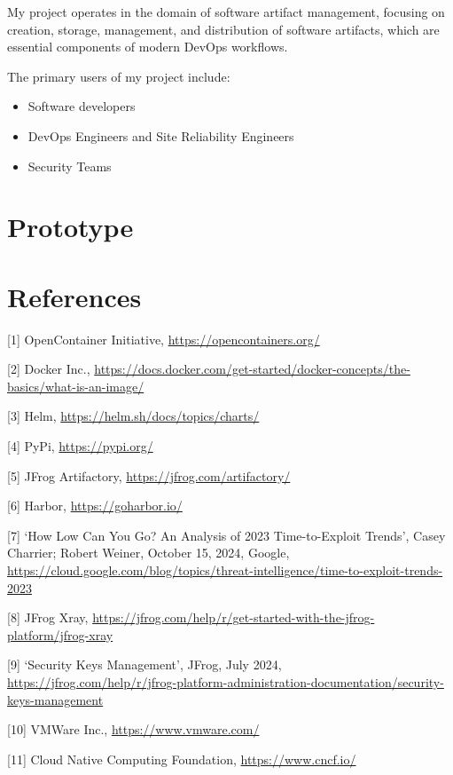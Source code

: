 \documentclass{article}
\begin{document}
  My project operates in the domain of software artifact management, focusing on creation, storage, management, and distribution of software artifacts, which are essential components of modern DevOps workflows.

  The primary users of my project include:

  \begin{itemize}
    \item Software developers
    \item DevOps Engineers and Site Reliability Engineers
    \item Security Teams
  \end{itemize}


  




  \section{Prototype}


  \section{References}

  [1] OpenContainer Initiative, \url{https://opencontainers.org/}
  
  [2] Docker Inc., \url{https://docs.docker.com/get-started/docker-concepts/the-basics/what-is-an-image/}

  [3] Helm, \url{https://helm.sh/docs/topics/charts/}

  [4] PyPi, \url{https://pypi.org/}

  [5] JFrog Artifactory, \url{https://jfrog.com/artifactory/}

  [6] Harbor, \url{https://goharbor.io/}

  [7] `How Low Can You Go? An Analysis of 2023 Time-to-Exploit Trends', Casey Charrier; Robert Weiner, October 15, 2024, Google, \url{https://cloud.google.com/blog/topics/threat-intelligence/time-to-exploit-trends-2023}

  [8] JFrog Xray, \url{https://jfrog.com/help/r/get-started-with-the-jfrog-platform/jfrog-xray}

  [9] `Security Keys Management', JFrog, July 2024, \url{https://jfrog.com/help/r/jfrog-platform-administration-documentation/security-keys-management}

  [10] VMWare Inc., \url{https://www.vmware.com/}

  [11] Cloud Native Computing Foundation, \url{https://www.cncf.io/}
\end{document}
